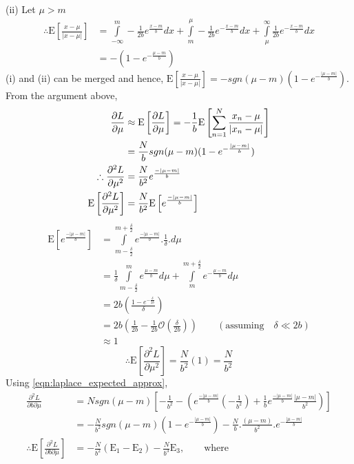 \documentclass[wcp]{jmlr}
\begin{document}
(ii) Let $\mu > m$
\begin{align*}
 \therefore \mathrm{E}\left[\frac{x-\mu}{|x-\mu|}\right] &= \int\limits_{-\infty}^{m} -\frac{1}{2b} e^{\frac{x-m}{b}} dx + \int\limits_{m}^{\mu} -\frac{1}{2b} e^{-\frac{x-m}{b}} dx + \int\limits_{\mu}^{\infty} \frac{1}{2b} e^{-\frac{x-m}{b}} dx \\
 &= -(1 - e^{-\frac{\mu-m}{b}})
\end{align*}
(i) and (ii) can be merged and hence, $\mathrm{E}\left[\frac{x-\mu}{|x-\mu|}\right] = - sgn(\mu-m) (1 - e^{-\frac{|\mu-m|}{b}})$. From the argument above,
\begin{align}
 \frac{\partial L}{\partial \mu} &\approx \mathrm{E}\left[\frac{\partial L}{\partial \mu}\right] = -\frac{1}{b} \mathrm{E}\left[\sum_{n=1}^{N}\frac{x_n-\mu}{|x_n-\mu|}\right]\notag\\
 &= \frac{N}{b} sgn(\mu-m) (1 - e^{-\frac{|\mu-m|}{b}}) \label{eqn:laplace_expected_approx}\\
 \therefore \frac{\partial^2 L}{\partial \mu^2} &= \frac{N}{b^2} e^{\frac{-|\mu-m|}{b}} \notag\\
 \mathrm{E} \left[\frac{\partial^2 L}{\partial \mu^2}\right] &= \frac{N}{b^2} \mathrm{E}\left[e^{\frac{-|\mu-m|}{b}}\right] \notag
\end{align}
\begin{align*}
 \mathrm{E}\left[e^{\frac{-|\mu-m|}{b}}\right] &= \int\limits_{m-\frac{\delta}{2}}^{m+\frac{\delta}{2}} e^{\frac{-|\mu-m|}{b}} . \frac{1}{\delta} . d\mu \\
 &= \frac{1}{\delta} \int\limits_{m-\frac{\delta}{2}}^{m} e^{\frac{\mu-m}{b}} d\mu + \int\limits_{m}^{m+\frac{\delta}{2}}e^{-\frac{\mu-m}{b}} d\mu \\
 &= 2b \left(\frac{1-e^{-\frac{\delta}{2b}}}{\delta}\right) \\
 &= 2b \left( \frac{1}{2b} - \frac{1}{2b}\mathcal{O}\left(\frac{\delta}{2b}\right) \right) \quad\quad(\mathrm{assuming} \quad \delta \ll 2b) \\
 &\approx 1
 \end{align*}
\begin{equation*}
 \therefore \mathrm{E} \left[\frac{\partial^2 L}{\partial \mu^2}\right] = \frac{N}{b^2} (1) = \frac{N}{b^2}
\end{equation*}
Using \eqref{eqn:laplace_expected_approx}, 
\begin{align*}
 \frac{\partial^2 L}{\partial b \partial \mu} &= N sgn(\mu-m) \left[ -\frac{1}{b^2} - \left( e^{\frac{-|\mu-m|}{b}} \left( -\frac{1}{b^2} \right) + \frac{1}{b} e^{\frac{-|\mu-m|}{b}} \frac{|\mu-m|}{b^2} \right) \right] \\
 &= -\frac{N}{b^2} sgn(\mu-m)(1-e^{-\frac{|\mu-m|}{b}}) - \frac{N}{b} . \frac{(\mu-m)}{b^2} . e^{-\frac{|\mu-m|}{b}} \\
 \therefore \mathrm{E} \left[\frac{\partial^2 L}{\partial b \partial \mu}\right] &= -\frac{N}{b^2} (\mathrm{E}_1 - \mathrm{E}_2) - \frac{N}{b^3} \mathrm{E}_3, \quad\quad\mathrm{where}
\end{align*}
\end{document}
